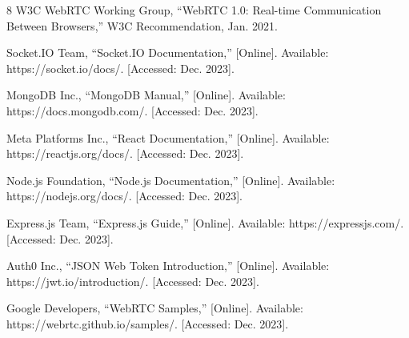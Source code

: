 \documentclass[conference]{IEEEtran}
\begin{document}
\begin{thebibliography}{8}
W3C WebRTC Working Group, ``WebRTC 1.0: Real-time Communication Between Browsers,'' W3C Recommendation, Jan. 2021.

Socket.IO Team, ``Socket.IO Documentation,'' [Online]. Available: https://socket.io/docs/. [Accessed: Dec. 2023].

MongoDB Inc., ``MongoDB Manual,'' [Online]. Available: https://docs.mongodb.com/. [Accessed: Dec. 2023].

Meta Platforms Inc., ``React Documentation,'' [Online]. Available: https://reactjs.org/docs/. [Accessed: Dec. 2023].

Node.js Foundation, ``Node.js Documentation,'' [Online]. Available: https://nodejs.org/docs/. [Accessed: Dec. 2023].

Express.js Team, ``Express.js Guide,'' [Online]. Available: https://expressjs.com/. [Accessed: Dec. 2023].

Auth0 Inc., ``JSON Web Token Introduction,'' [Online]. Available: https://jwt.io/introduction/. [Accessed: Dec. 2023].

Google Developers, ``WebRTC Samples,'' [Online]. Available: https://webrtc.github.io/samples/. [Accessed: Dec. 2023].
\end{thebibliography}
\end{document}
